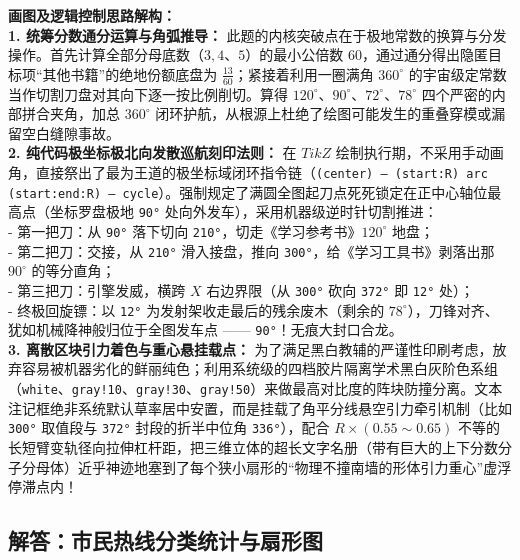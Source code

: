 \vspace{0.4cm}
{\small\color{blue!70!black}
\textbf{画图及逻辑控制思路解构：}\\
\textbf{1. 统筹分数通分运算与角弧推导：} 此题的内核突破点在于极地常数的换算与分发操作。首先计算全部分母底数（$3, 4$、$5$）的最小公倍数 60，通过通分得出隐匿目标项“其他书籍”的绝地份额底盘为 $\frac{13}{60}$；紧接着利用一圈满角 $360^\circ$ 的宇宙级定常数当作切割刀盘对其向下逐一按比例削切。算得 $120^\circ$、$90^\circ、72^\circ$、$78^\circ$ 四个严密的内部拼合夹角，加总 $360^\circ$ 闭环护航，从根源上杜绝了绘图可能发生的重叠穿模或漏留空白缝隙事故。\\
\textbf{2. 纯代码极坐标极北向发散巡航刻印法则：} 在 $TikZ$ 绘制执行期，不采用手动画角，直接祭出了最为王道的极坐标域闭环指令链（\texttt{(center) -- (start:R) arc (start:end:R) -- cycle}）。强制规定了满圆全图起刀点死死锁定在正中心轴位最高点（坐标罗盘极地 \texttt{90°} 处向外发车），采用机器级逆时针切割推进：\\
- 第一把刀：从 \texttt{90°} 落下切向 \texttt{210°}，切走《学习参考书》$120^\circ$ 地盘；\\
- 第二把刀：交接，从 \texttt{210°} 滑入接盘，推向 \texttt{300°}，给《学习工具书》剥落出那 $90^\circ$ 的等分直角；\\
- 第三把刀：引擎发威，横跨 $X$ 右边界限（从 \texttt{300°} 砍向 \texttt{372°} 即 \texttt{12°} 处）；\\
- 终极回旋镖：以 \texttt{12°} 为发射架收走最后的残余废木（剩余的 $78^\circ$），刀锋对齐、犹如机械降神般归位于全图发车点 —— \texttt{90°}！无痕大封口合龙。\\
\textbf{3. 离散区块引力着色与重心悬挂载点：} 为了满足黑白教辅的严谨性印刷考虑，放弃容易被机器劣化的鲜丽纯色；利用系统级的四档胶片隔离学术黑白灰阶色系组（\texttt{white}、\texttt{gray!10}、\texttt{gray!30}、\texttt{gray!50}）来做最高对比度的阵块防撞分离。文本注记框绝非系统默认草率居中安置，而是挂载了角平分线悬空引力牵引机制（比如 \texttt{300°} 取值段与 \texttt{372°} 封段的折半中位角 \texttt{336°}），配合 $R \times (0.55\sim 0.65)$ 不等的长短臂变轨径向拉伸杠杆距，把三维立体的超长文字名册（带有巨大的上下分数分子分母体）近乎神迹地塞到了每个狭小扇形的“物理不撞南墙的形体引力重心”虚浮停滞点内！
}

\newpage

\newpage

\subsection{解答：市民热线分类统计与扇形图}

